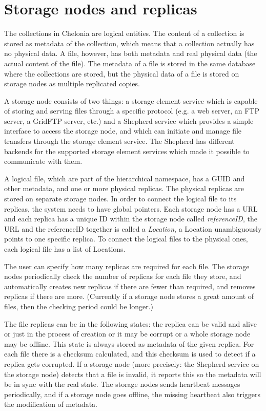 \documentclass{book}
\begin{document}

\section{Storage nodes and replicas} %
\label{sec:storage_nodes_and_replicas}

The collections in Chelonia are logical entities. The content of a collection is stored as metadata of the collection, which means that a collection actually has no physical data. A file, however, has both metadata and real physical data (the actual content of the file). The metadata of a file is stored in the same database where the collections are stored, but the physical data of a file is stored on storage nodes as multiple replicated copies.

A storage node consists of two things: a storage element service which is capable of storing and serving files through a specific protocol (e.g. a web server, an FTP server, a GridFTP server, etc.) and a Shepherd service which provides a simple interface to access the storage node, and which can initiate and manage file transfers through the storage element service. The Shepherd has different backends for the supported storage element services which made it possible to communicate with them.

A logical file, which are part of the hierarchical namespace, has a GUID and other metadata, and one or more physical replicas. The physical replicas are stored on separate storage nodes. In order to connect the logical file to its replicas, the system needs to have global pointers. Each storage node has a URL and each replica has a unique ID within the storage node called \emph{referenceID}, the URL and the referenceID together is called a \emph{Location}, a Location unambiguously points to one specific replica. To connect the logical files to the physical ones, each logical file has a list of Locations.

The user can specify how many replicas are required for each file. The storage nodes periodically check the number of replicas for each file they store, and automatically creates new replicas if there are fewer than required, and removes replicas if there are more. (Currently if a storage node stores a great amount of files, then the checking period could be longer.)

The file replicas can be in the following states: the replica can be valid and alive or just in the process of creation or it may be corrupt or a whole storage node may be offline. This state is always stored as metadata of the given replica. For each file there is a checksum calculated, and this checksum is used to detect if a replica gets corrupted. If a storage node (more precisely: the Shepherd service on the storage node) detects that a file is invalid, it reports this so the metadata will be in sync with the real state. The storage nodes sends heartbeat messages periodically, and if a storage node goes offline, the missing heartbeat also triggers the modification of metadata. 
\end{document}
